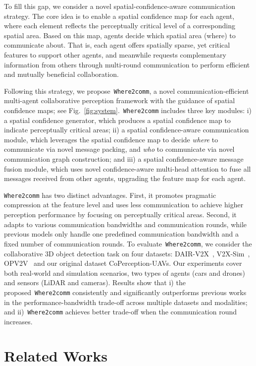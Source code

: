 \documentclass{article}
\begin{document}
To fill this gap, we consider a novel spatial-confidence-aware communication strategy. The core idea is to enable a spatial confidence map for each agent, where each element reflects the perceptually critical level of a corresponding spatial area. Based on this map, agents decide which spatial area (where) to communicate about. That is, each agent offers spatially sparse, yet critical features to support other agents, and meanwhile requests complementary information from others through multi-round communication to perform efficient and mutually beneficial collaboration.


Following this strategy, we propose~\texttt{Where2comm}, a novel communication-efficient multi-agent collaborative perception framework with the guidance of spatial confidence maps; see Fig.~\ref{fig:system}.~\texttt{Where2comm} includes three key modules: i) a spatial confidence generator, which produces a spatial confidence map to indicate perceptually critical areas; ii) a spatial confidence-aware communication module, which leverages the spatial confidence map to decide \textit{where} to communicate via novel message packing, and \textit{who} to communicate via novel communication graph construction; and iii) a spatial confidence-aware message fusion module, which uses novel confidence-aware multi-head attention to fuse all messages received from other agents, upgrading the feature map for each agent.


\texttt{Where2comm} has two distinct advantages. First, it promotes pragmatic compression at the feature level and uses less communication to achieve higher perception performance by focusing on perceptually critical areas. Second, it adapts to various communication bandwidths and communication rounds, while previous models only handle one predefined communication bandwidth and a fixed number of communication rounds. To evaluate~\texttt{Where2comm}, we consider the collaborative 3D object detection task on four datasets: DAIR-V2X~\cite{dair}, V2X-Sim~\cite{V2XSim}, OPV2V~\cite{OPV2V} and our original dataset CoPerception-UAVs. Our experiments cover both real-world and simulation scenarios, two types of agents (cars and drones) and sensors (LiDAR and cameras). Results show that i) the proposed~\texttt{Where2comm} consistently and significantly outperforms previous works in the performance-bandwidth trade-off across multiple datasets and modalities; and ii)~\texttt{Where2comm} achieves better trade-off when the communication round increases.
 \vspace{-3mm}
\section{Related Works}\label{related_works}
\vspace{-3mm}
\end{document}
